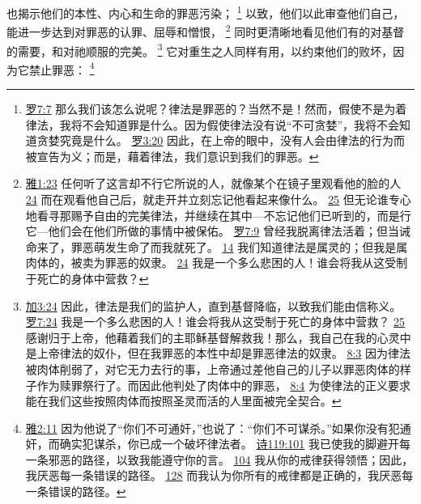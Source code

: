 \documentclass[12pt, a4paper, oneside]{ctexart}
\begin{document}
	也揭示他们的本性、内心和生命的罪恶污染；
	\footnote {
		\href{https://biblehub.com/romans/7-7.htm}{罗7:7} 那么我们该怎么说呢？律法是罪恶的？当然不是！然而，假使不是为着律法，我将不会知道罪是什么。因为假使律法没有说“不可贪婪”，我将不会知道贪婪究竟是什么。
		\href{https://biblehub.com/romans/3-20.htm}{罗3:20} 因此，在上帝的眼中，没有人会由律法的行为而被宣告为义；而是，藉着律法，我们意识到我们的罪恶。
	}
	以致，他们以此审查他们自己，能进一步达到对罪恶的认罪、屈辱和憎恨，
	\footnote {
		\href{https://biblehub.com/james/1-23.htm}{雅1:23} 任何听了这言却不行它所说的人，就像某个在镜子里观看他的脸的人
		\href{https://biblehub.com/james/1-24.htm}{24} 而在观看他自己后，就走开并立刻忘记他看起来像什么。
		\href{https://biblehub.com/james/1-25.htm}{25} 但无论谁专心地看寻那赐予自由的完美律法，并继续在其中---不忘记他们已听到的，而是行它---他们会在他们所做的事情中被保佑。
		\href{https://biblehub.com/romans/7-9.htm}{罗7:9} 曾经我脱离律法活着；但当诫命来了，罪恶萌发生命了而我就死了。
		\href{https://biblehub.com/romans/7-14.htm}{14} 我们知道律法是属灵的；但我是属肉体的，被卖为罪恶的奴隶。
		\href{https://biblehub.com/romans/7-24.htm}{24} 我是一个多么悲困的人！谁会将我从这受制于死亡的身体中营救？
	}
	同时更清晰地看见他们有的对基督的需要，和对祂顺服的完美。
	\footnote {
		\href{https://biblehub.com/galatians/3-24.htm}{加3:24} 因此，律法是我们的监护人，直到基督降临，以致我们能由信称义。
		\href{https://biblehub.com/romans/7-24.htm}{罗7:24} 我是一个多么悲困的人！谁会将我从这受制于死亡的身体中营救？
		\href{https://biblehub.com/romans/7-25.htm}{25} 感谢归于上帝，他藉着我们的主耶稣基督解救我！那么，我自己在我的心灵中是上帝律法的奴仆，但在我罪恶的本性中却是罪恶律法的奴隶。
		\href{https://biblehub.com/romans/8-3.htm}{8:3} 因为律法被肉体削弱了，对它无力去行的事，上帝通过差他自己的儿子以罪恶肉体的样子作为赎罪祭行了。而因此他判处了肉体中的罪恶，
		\href{https://biblehub.com/romans/8-4.htm}{8:4} 为使律法的正义要求能在我们这些按照肉体而按照圣灵而活的人里面被完全契合。
	}
	它对重生之人同样有用，以约束他们的败坏，因为它禁止罪恶：
	\footnote {
		\href{https://biblehub.com/james/2-11.htm}{雅2:11} 因为他说了“你们不可通奸，”也说了：“你们不可谋杀。”如果你没有犯通奸，而确实犯谋杀，你已成一个破坏律法者。
		\href{https://biblehub.com/psalms/119-101.htm}{诗119:101} 我已使我的脚避开每一条邪恶的路径，以致我能遵守你的言。
		\href{https://biblehub.com/psalms/119-104.htm}{104} 我从你的戒律获得领悟；因此，我厌恶每一条错误的路径。
		\href{https://biblehub.com/psalms/119-128.htm}{128} 而我认为你所有的戒律都是正确的，我厌恶每一条错误的路径。
	}
\end{document}
